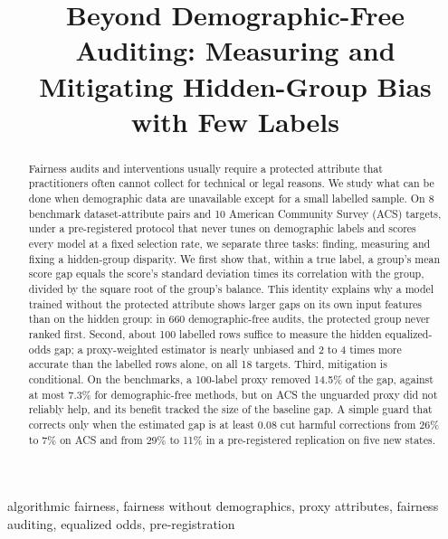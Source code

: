 \documentclass[conference]{IEEEtran}
\begin{document}
\title{Beyond Demographic-Free Auditing: Measuring and Mitigating Hidden-Group Bias with Few Labels}


\author{
}

\maketitle

\begin{abstract}
Fairness audits and interventions usually require a protected attribute that practitioners often cannot collect for technical or legal reasons. We study what can be done when demographic data are unavailable except for a small labelled sample. On 8 benchmark dataset-attribute pairs and 10 American Community Survey (ACS) targets, under a pre-registered protocol that never tunes on demographic labels and scores every model at a fixed selection rate, we separate three tasks: finding, measuring and fixing a hidden-group disparity. We first show that, within a true label, a group's mean score gap equals the score's standard deviation times its correlation with the group, divided by the square root of the group's balance. This identity explains why a model trained without the protected attribute shows larger gaps on its own input features than on the hidden group: in 660 demographic-free audits, the protected group never ranked first. Second, about 100 labelled rows suffice to measure the hidden equalized-odds gap; a proxy-weighted estimator is nearly unbiased and 2 to 4 times more accurate than the labelled rows alone, on all 18 targets. Third, mitigation is conditional. On the benchmarks, a 100-label proxy removed 14.5\% of the gap, against at most 7.3\% for demographic-free methods, but on ACS the unguarded proxy did not reliably help, and its benefit tracked the size of the baseline gap. A simple guard that corrects only when the estimated gap is at least 0.08 cut harmful corrections from 26\% to 7\% on ACS and from 29\% to 11\% in a pre-registered replication on five new states.
\end{abstract}

\begin{IEEEkeywords}
algorithmic fairness, fairness without demographics, proxy attributes, fairness auditing, equalized odds, pre-registration
\end{IEEEkeywords}
\end{document}
